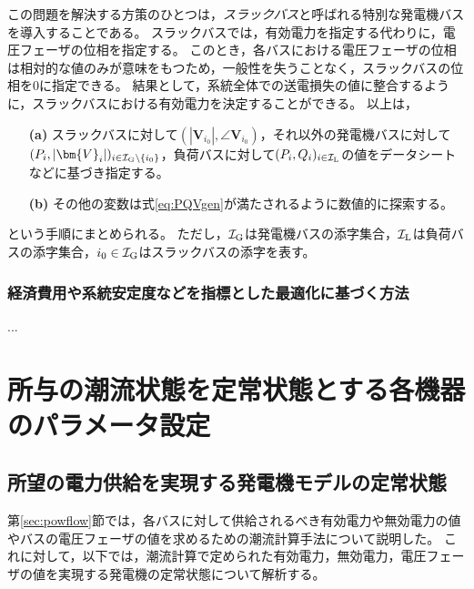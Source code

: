\documentclass[tombow,dvipdfmx]{corona-a5}
\begin{document}
この問題を解決する方策のひとつは，\emph{スラックバス}と呼ばれる特別な発電機バスを導入することである。
スラックバスでは，有効電力を指定する代わりに，電圧フェーザの位相を指定する。
このとき，各バスにおける電圧フェーザの位相は相対的な値のみが意味をもつため，一般性を失うことなく，スラックバスの位相を0に指定できる。
結果として，系統全体での送電損失の値に整合するように，スラックバスにおける有効電力を決定することができる。
以上は，
\begin{itemize}
\item[\textbf{(a)}] スラックバスに対して$(|\bm{V}_{i_0}|,\angle \bm{V}_{i_0})$，それ以外の発電機バスに対して$(P_i,|\bm{V}_{i}|)_{i \in \mathcal{I}_{\rm G}\setminus\{i_0\} }$，負荷バスに対して$(P_i,Q_i)_{i \in \mathcal{I}_{\rm L}}$の値をデータシートなどに基づき指定する。
\item[\textbf{(b)}] その他の変数は式\ref{eq:PQVgen}が満たされるように数値的に探索する。
\end{itemize}
という手順にまとめられる。
ただし，$\mathcal{I}_{\rm G}$は発電機バスの添字集合，$\mathcal{I}_{\rm L}$は負荷バスの添字集合，$i_0 \in \mathcal{I}_{\rm G}$はスラックバスの添字を表す。


\subsubsection{経済費用や系統安定度などを指標とした最適化に基づく方法}

...

\section{所与の潮流状態を定常状態とする各機器のパラメータ設定}\label{sec:paradef}

\subsection{所望の電力供給を実現する発電機モデルの定常状態}\label{sec:stagen}

第\ref{sec:powflow}節では，各バスに対して供給されるべき有効電力や無効電力の値やバスの電圧フェーザの値を求めるための潮流計算手法について説明した。
これに対して，以下では，潮流計算で定められた有効電力，無効電力，電圧フェーザの値を実現する発電機の定常状態について解析する。
\end{document}
